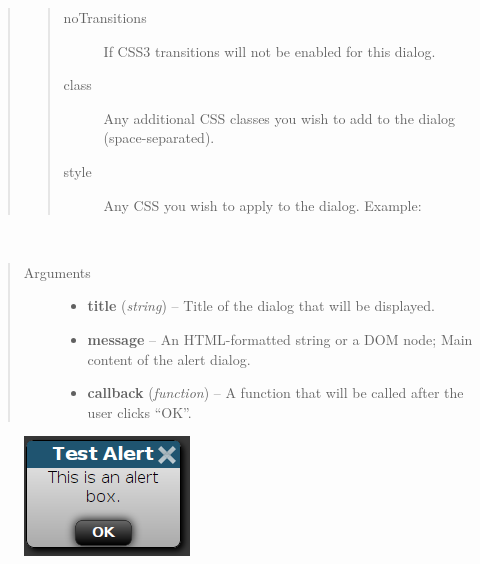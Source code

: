 \documentclass[letterpaper,10pt,openany]{sphinxmanual}
\begin{document}
\begin{fulllineitems}
\begin{fulllineitems}
\begin{fulllineitems}
\begin{quote}
\begin{quote}
\begin{description}
\item[{noTransitions}] \leavevmode
If  CSS3 transitions will not be enabled for this dialog.

\item[{class}] \leavevmode
Any additional CSS classes you wish to add to the dialog (space-separated).

\item[{style}] \leavevmode
Any CSS you wish to apply to the dialog.  Example:  

\end{description}\end{quote}
\end{quote}

\end{fulllineitems}



\begin{fulllineitems}
\label{Developer/js_gateone:GateOne.Visual.alert}~\begin{quote}\begin{description}
\item[{Arguments}] \leavevmode\begin{itemize}
\item {} 
\textbf{title} (\emph{string}) -- Title of the dialog that will be displayed.

\item {} 
\textbf{message} -- An HTML-formatted string or a DOM node; Main content of the alert dialog.

\item {} 
\textbf{callback} (\emph{function}) -- A function that will be called after the user clicks ``OK''.

\end{itemize}

\end{description}\end{quote}
\begin{figure}[htbp]\begin{flushright}

\includegraphics{gateone_alert.png}
\end{flushright}\end{figure}


\end{fulllineitems}
\end{fulllineitems}
\end{fulllineitems}
\end{document}
